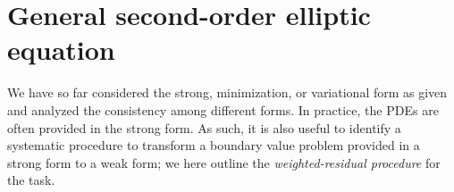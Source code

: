 




\section{General second-order elliptic equation}
We have so far considered the strong, minimization, or variational form as given and analyzed the consistency among different forms.  In practice, the PDEs are often provided in the strong form. As such, it is also useful to identify a systematic procedure to transform a boundary value problem provided in a strong form to a weak form; we here outline the \emph{weighted-residual procedure} for the task.

